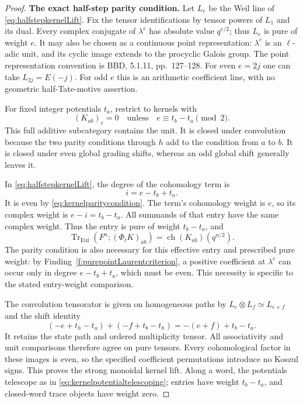 \begin{proof}
\par\smallskip\noindent\textbf{The exact half-step parity condition.}\quad
Let \(L_e\) be the Weil line of
\eqref{eq:halfstepkernelLift}. Fix the tensor
identifications by tensor powers of \(L_1\) and its dual.
Every complex conjugate of \(\lambda^e\) has absolute
value \(q^{e/2}\); thus \(L_e\) is pure of weight \(e\).
It may also be chosen as a continuous point representation:
\(\lambda^e\) is an \(\ell\)-adic unit, and its cyclic
image extends to the procyclic Galois group. The point
representation convention is BBD, 5.1.11, pp.~127--128.
For even \(e=2j\) one can take \(L_{2j}=E(-j)\).
For odd \(e\) this is an arithmetic coefficient line,
with no geometric half-Tate-motive assertion.

For fixed integer potentials \(t_a\), restrict to kernels
with
\begin{equation}\label{eq:kernelparitycondition}
       (K_{ab})_e=0
       \quad\text{unless}\quad
       e\equiv t_b-t_a\pmod2.
\end{equation}
This full additive subcategory contains the unit.
It is closed under convolution because the two parity
conditions through \(h\) add to the condition from \(a\)
to \(b\). It is closed under even global grading shifts,
whereas an odd global shift generally leaves it.

In \eqref{eq:halfstepkernelLift}, the degree of the
cohomology term is
\[
                   i=e-t_b+t_a.
\]
It is even by \eqref{eq:kernelparitycondition}.
The term's cohomology weight is \(e\), so its complex
weight is \(e-i=t_b-t_a\). All summands of that entry have
the same complex weight. Thus the entry is pure of
weight \(t_b-t_a\), and
\begin{equation}\label{eq:halfstepkernelTrace}
 \operatorname{Tr}_{\mathrm{Eul}}
   (F^n;(\Phi_tK)_{ab})
     =\operatorname{ch}(K_{ab})(q^{n/2}).
\end{equation}
The parity condition is also necessary for this effective
entry and prescribed pure weight: by
Finding~\ref{f:purepointLaurentcriterion}, a positive
coefficient at \(\lambda^e\) can occur only in degree
\(e-t_b+t_a\), which must be even. This necessity is
specific to the stated entry-weight comparison.

The convolution tensorator is given on homogeneous paths
by \(L_e\otimes L_f\simeq L_{e+f}\) and the shift identity
\begin{equation}\label{eq:kernelpotentialtelescoping}
 (-e+t_h-t_a)+(-f+t_b-t_h)
       =-(e+f)+t_b-t_a.
\end{equation}
It retains the state path and ordered multiplicity tensor.
All associativity and unit comparisons therefore agree
on pure tensors. Every cohomological factor in these
images is even, so the specified coefficient permutations
introduce no Koszul signs. This proves the strong
monoidal kernel lift.
Along a word, the potentials telescope as in
\eqref{eq:kernelpotentialtelescoping}; entries have weight
\(t_b-t_a\), and closed-word trace objects have weight zero.


\end{proof}
